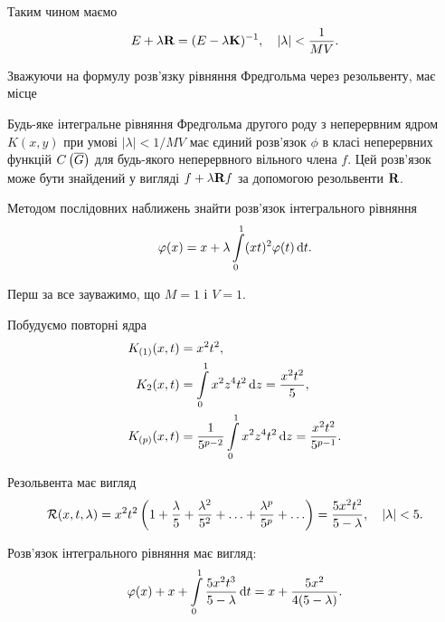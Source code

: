 Таким чином маємо
\begin{equation}
	E + \lambda \bf{R} = (E - \lambda \bf{K})^{-1}, \quad |\lambda| < \dfrac{1}{MV}.
\end{equation}

Зважуючи на формулу розв'язку рівняння Фредгольма через резольвенту, має місце
\begin{theorem}
	Будь-яке інтегральне рівняння Фредгольма другого роду з неперервним ядром $K(x, y)$ при умові $|\lambda| < 1 / MV$ має єдиний розв'язок $\phi$ в класі неперервних функцій $\CoG$ для будь-якого неперервного вільного члена $f$. Цей розв'язок може бути знайдений у вигляді $f + \lambda \bf{R} f$ за допомогою резольвенти $\bf{R}$.
\end{theorem}

\newpage

\begin{example}
	Методом послідовних наближень знайти розв'язок інтегрального рівняння \begin{equation*}\phi(x) = x + \lambda \Int_0^1 (xt)^2 \phi(t) \diff t.\end{equation*}
\end{example}

\begin{solution}
	Перш за все зауважимо, що $M = 1$ і $V = 1$. \medskip

	Побудуємо повторні ядра 
	\begin{equation*}
		\begin{aligned} 
			K_{(1)}(x, t) &= x^2t^2, \\
			K_2(x, t) &= \Int_0^1 x^2 z^4 t^2 \diff z = \dfrac{x^2t^2}{5}, \\ 
			K_{(p)}(x, t) &= \dfrac{1}{5^{p - 2}} \Int_0^1 x^2 z^4 t^2 \diff z = \dfrac{x^2t^2}{5^{p - 1}}.
		\end{aligned}
	\end{equation*}
		
	Резольвента має вигляд 
	\begin{equation*}
		\cal{R}(x, t, \lambda) = x^2 t^2 \left(1 + \frac{\lambda}{5} + \frac{\lambda^2}{5^2} + \ldots + \frac{\lambda^p}{5^p} + \ldots \right) = \frac{5x^2t^2}{5 - \lambda}, \quad |\lambda| < 5.
	\end{equation*}

	Розв'язок інтегрального рівняння має вигляд: 
	\begin{equation*}
		\phi(x) + x + \Int_0^1 \dfrac{5x^2t^3}{5 - \lambda} \diff t = x + \dfrac{5x^2}{4(5 - \lambda)}.
	\end{equation*}
\end{solution}

